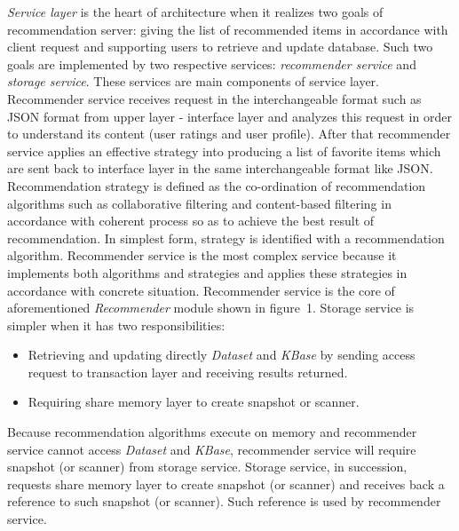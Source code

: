 \documentclass[a4paper]{llncs}
\begin{document}
\textit{Service layer} is the heart of architecture when it realizes two goals of recommendation server: giving the list of recommended items in accordance with client request and supporting users to retrieve and update database. Such two goals are implemented by two respective services: \textit{recommender service} and \textit{storage service}. These services are main components of service layer. Recommender service receives request in the interchangeable format such as JSON format from upper layer - interface layer and analyzes this request in order to understand its content (user ratings and user profile). After that recommender service applies an effective strategy into producing a list of favorite items which are sent back to interface layer in the same interchangeable format like JSON. Recommendation strategy is defined as the co-ordination of recommendation algorithms such as collaborative filtering and content-based filtering in accordance with coherent process so as to achieve the best result of recommendation. In simplest form, strategy is identified with a recommendation algorithm. Recommender service is the most complex service because it implements both algorithms and strategies and applies these strategies in accordance with concrete situation. Recommender service is the core of aforementioned \textit{Recommender} module shown in figure~1. Storage service is simpler when it has two responsibilities:
\begin{itemize}
\item Retrieving and updating directly \textit{Dataset} and \textit{KBase} by sending access request to transaction layer and receiving results returned.
\item Requiring share memory layer to create snapshot or scanner.
\end{itemize}
Because recommendation algorithms execute on memory and recommender service cannot access \textit{Dataset} and \textit{KBase}, recommender service will require snapshot (or scanner) from storage service. Storage service, in succession, requests share memory layer to create snapshot (or scanner) and receives back a reference to such snapshot (or scanner). Such reference is used by recommender service.
\end{document}
